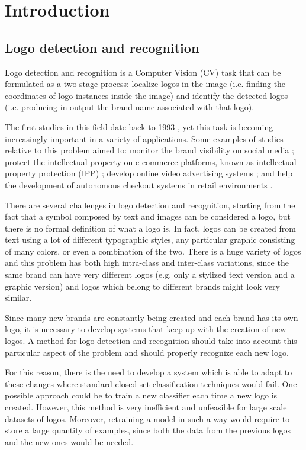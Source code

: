 \chapter{Introduction}
\label{chap:introduction}

\section{Logo detection and recognition}
\label{sec:logodet-intro}

Logo detection and recognition is a Computer Vision (CV) task that can be formulated as a two-stage process: localize logos in the image (i.e. finding the coordinates of logo instances inside the image) and identify the detected logos (i.e. producing in output the brand name associated with that logo).

The first studies in this field date back to 1993 \cite{doermann1993logo}, yet this task is becoming increasingly important in a variety of applications. Some examples of studies relative to this problem aimed to: monitor the brand visibility on social media \cite{7492197}; protect the intellectual property on e-commerce platforms, known as intellectual property protection (IPP) \cite{jin2020open}; develop online video advertising systems \cite{cheng2017video}; and help the development of autonomous checkout systems in retail environments \cite{mata2022standardsim}.

There are several challenges in logo detection and recognition, starting from the fact that a symbol composed by text and images can be considered a logo, but there is no formal definition of what a logo is. In fact, logos can be created from text using a lot of different typographic styles, any particular graphic consisting of many colors, or even a combination of the two.
There is a huge variety of logos and this problem has both high intra-class and inter-class variations, since the same brand can have very different logos (e.g. only a stylized text version and a graphic version) and logos which belong to different brands might look very similar.

Since many new brands are constantly being created and each brand has its own logo, it is necessary to develop systems that keep up with the creation of new logos. A method for logo detection and recognition should take into account this particular aspect of the problem and should properly recognize each new logo.

For this reason, there is the need to develop a system which is able to adapt to these changes where standard closed-set classification techniques would fail. One possible approach could be to train a new classifier each time a new logo is created. However, this method is very inefficient and unfeasible for large scale datasets of logos. Moreover, retraining a model in such a way would require to store a large quantity of examples, since both the data from the previous logos and the new ones would be needed.

